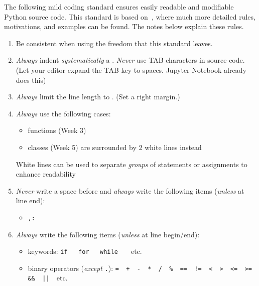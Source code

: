 \documentclass[a4paper,11pt]{article}
\begin{document}
The following mild coding standard ensures
easily readable and modifiable Python source code.
This standard is based on~\cite{CodeConventions:2001},
where much more detailed rules, motivations, and examples can be found.
The notes below explain these rules.

\reversemarginpar
\begin{enumerate}

\item\label{it:consistency}
Be consistent when using the freedom that this standard leaves.

\item\label{it:indentation}
\emph{Always\/} indent \emph{systematically\/} a .
\emph{Never\/} use TAB characters in source code.
(Let your editor expand the TAB key to spaces. Jupyter Notebook already does this)

\item\label{it:line-length}
\emph{Always\/} limit the line length to .
(Set a right margin.)

\item\label{it:empty-lines}
\emph{Always\/} use  the following cases:
\begin{itemize}
    \item functions (Week 3)
    \item classes (Week 5) are surrounded by 2 white lines instead
\end{itemize}
White lines can be used to separate \emph{groups\/} of statements or assignments to enhance readability

\item\label{it:spacing-1}
\emph{Never\/} write a space before
and \emph{always\/} write  the following items
(\emph{unless} at  line end):
\begin{itemize}
\item \lstinline","\quad\lstinline":"
\end{itemize}

\item\label{it:spacing-2}
\emph{Always\/} write  the following items
(\emph{unless} at line begin/end):
\begin{itemize}
\item keywords: \lstinline"if   for   while   " etc.
\item binary operators (\emph{except\/} \lstinline"."): \lstinline"=  +  -  *  /  %  ==  !=  <  >  <=  >=  &&  || "~etc.
\end{itemize}


\end{enumerate}
\end{document}

